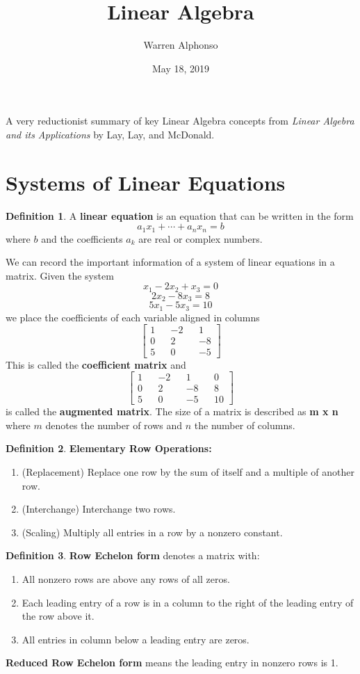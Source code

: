 \documentclass[letterpaper]{article}
\title{Linear Algebra}
\author{Warren Alphonso}
\date{May 18, 2019}
\theoremstyle{definition}
\newtheorem{definition}{Definition}[section]
\begin{document}
\maketitle
A very reductionist summary of key Linear Algebra concepts from \textit{Linear Algebra and its Applications} by Lay, Lay, and McDonald. 

\section{Systems of Linear Equations}
\begin{definition}
A \textbf{linear equation} is an equation that can be written in the form 
$$ a_{1}x_{1} + \cdots + a_{n}x_{n} = b$$ 
where $b$ and the coefficients $a_{k}$ are real or complex numbers. 
\end{definition}

We can record the important information of a system of linear equations in a matrix. Given the system
$$x_1 - 2x_2 + x_3 = 0$$ 
$$2x_2 - 8x_3 = 8 $$
$$5x_1 - 5x_3 = 10 $$
we place the coefficients of each variable aligned in columns
$$\begin{bmatrix}
1 && -2 && 1 \\
0 && 2 && -8 \\
5 && 0 && -5
\end{bmatrix}$$
This is called the \textbf{coefficient matrix} and 
$$\begin{bmatrix}
1 && -2 && 1 && 0 \\
0 && 2 && -8 && 8 \\
5 && 0 && -5 && 10
\end{bmatrix}$$
is called the \textbf{augmented matrix}. The size of a matrix is described as \textbf{ m x n} where $m$ denotes the number of rows and $n$ the number of columns. 

\begin{definition}
\textbf{Elementary Row Operations:}
\begin{enumerate}
	\item (Replacement) Replace one row by the sum of itself and a multiple of another row. 
	\item (Interchange) Interchange two rows. 
	\item (Scaling) Multiply all entries in a row by a nonzero constant. 
\end{enumerate}
\end{definition}

\begin{definition}
\textbf{Row Echelon form} denotes a matrix with: 
\begin{enumerate}
	\item All nonzero rows are above any rows of all zeros.
	\item Each leading entry of a row is in a column to the right of the leading entry of the row above it. 
	\item All entries in  column below a leading entry are zeros. 
\end{enumerate}
\textbf{Reduced Row Echelon form} means the leading entry in nonzero rows is 1. 
\end{definition}
\end{document}
